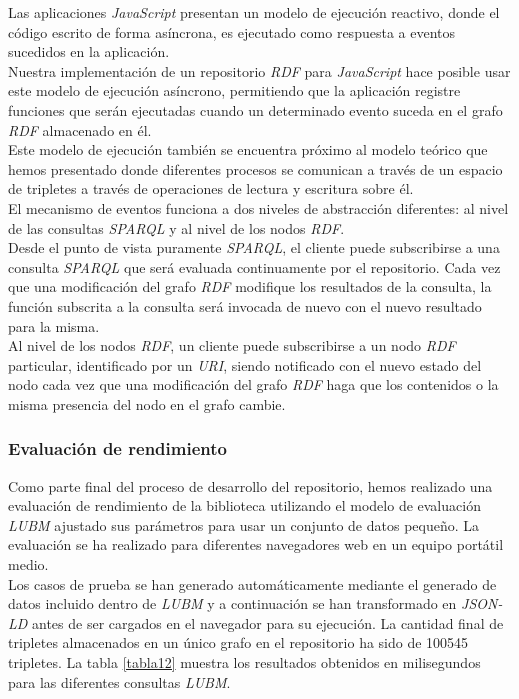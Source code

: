 Las aplicaciones \textit{JavaScript} presentan un modelo de ejecuci\'on reactivo, donde el c\'odigo escrito de forma as\'incrona, es ejecutado como respuesta a eventos sucedidos en la aplicaci\'on.\\
Nuestra implementaci\'on de un repositorio \textit{RDF} para \textit{JavaScript} hace posible usar este modelo de ejecuci\'on as\'incrono, permitiendo que la aplicaci\'on registre funciones que ser\'an ejecutadas cuando un determinado evento suceda en el grafo \textit{RDF} almacenado en \'el.\\
Este modelo de ejecuci\'on tambi\'en se encuentra pr\'oximo al modelo te\'orico que hemos presentado donde diferentes procesos se comunican a trav\'es de un espacio de tripletes a trav\'es de operaciones de lectura y escritura sobre \'el.\\
El mecanismo de eventos funciona a dos niveles de abstracci\'on diferentes: al nivel de las consultas \textit{SPARQL} y al nivel de los nodos \textit{RDF}.\\
Desde el punto de vista puramente \textit{SPARQL}, el cliente puede subscribirse a una consulta \textit{SPARQL} que ser\'a evaluada continuamente por el repositorio. Cada vez que una modificaci\'on del grafo \textit{RDF} modifique los resultados de la consulta, la funci\'on subscrita a la consulta ser\'a invocada de nuevo con el nuevo resultado para la misma.\\
Al nivel de los nodos \textit{RDF}, un cliente puede subscribirse a un nodo \textit{RDF} particular, identificado por un \textit{URI}, siendo notificado con el nuevo estado del nodo cada vez que una modificaci\'on del grafo \textit{RDF} haga que los contenidos o la misma presencia del nodo en el grafo cambie.

\subsubsection{Evaluaci\'on de rendimiento}

Como parte final del proceso de desarrollo del repositorio, hemos realizado una evaluaci\'on de rendimiento de la biblioteca utilizando el modelo de evaluaci\'on \textit{LUBM} \cite{lubm} ajustado sus par\'ametros para usar un conjunto de datos peque\~no. La evaluaci\'on se ha realizado para diferentes navegadores web en un equipo port\'atil medio.\\
Los casos de prueba se han generado autom\'aticamente mediante el generado de datos incluido dentro de \textit{LUBM} y a continuaci\'on se han transformado en \textit{JSON-LD} antes de ser cargados en el navegador para su ejecuci\'on. La cantidad final de tripletes almacenados en un \'unico grafo en el repositorio ha sido de 100545 tripletes. La tabla \ref{tabla12} muestra los resultados obtenidos en milisegundos para las diferentes consultas \textit{LUBM}.\\

